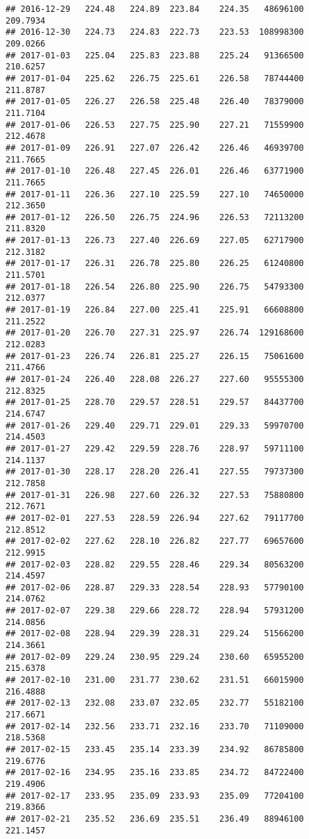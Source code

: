 \documentclass[
]{article}
\begin{document}
\begin{verbatim}
## 2016-12-29   224.48   224.89  223.84    224.35   48696100     209.7934
## 2016-12-30   224.73   224.83  222.73    223.53  108998300     209.0266
## 2017-01-03   225.04   225.83  223.88    225.24   91366500     210.6257
## 2017-01-04   225.62   226.75  225.61    226.58   78744400     211.8787
## 2017-01-05   226.27   226.58  225.48    226.40   78379000     211.7104
## 2017-01-06   226.53   227.75  225.90    227.21   71559900     212.4678
## 2017-01-09   226.91   227.07  226.42    226.46   46939700     211.7665
## 2017-01-10   226.48   227.45  226.01    226.46   63771900     211.7665
## 2017-01-11   226.36   227.10  225.59    227.10   74650000     212.3650
## 2017-01-12   226.50   226.75  224.96    226.53   72113200     211.8320
## 2017-01-13   226.73   227.40  226.69    227.05   62717900     212.3182
## 2017-01-17   226.31   226.78  225.80    226.25   61240800     211.5701
## 2017-01-18   226.54   226.80  225.90    226.75   54793300     212.0377
## 2017-01-19   226.84   227.00  225.41    225.91   66608800     211.2522
## 2017-01-20   226.70   227.31  225.97    226.74  129168600     212.0283
## 2017-01-23   226.74   226.81  225.27    226.15   75061600     211.4766
## 2017-01-24   226.40   228.08  226.27    227.60   95555300     212.8325
## 2017-01-25   228.70   229.57  228.51    229.57   84437700     214.6747
## 2017-01-26   229.40   229.71  229.01    229.33   59970700     214.4503
## 2017-01-27   229.42   229.59  228.76    228.97   59711100     214.1137
## 2017-01-30   228.17   228.20  226.41    227.55   79737300     212.7858
## 2017-01-31   226.98   227.60  226.32    227.53   75880800     212.7671
## 2017-02-01   227.53   228.59  226.94    227.62   79117700     212.8512
## 2017-02-02   227.62   228.10  226.82    227.77   69657600     212.9915
## 2017-02-03   228.82   229.55  228.46    229.34   80563200     214.4597
## 2017-02-06   228.87   229.33  228.54    228.93   57790100     214.0762
## 2017-02-07   229.38   229.66  228.72    228.94   57931200     214.0856
## 2017-02-08   228.94   229.39  228.31    229.24   51566200     214.3661
## 2017-02-09   229.24   230.95  229.24    230.60   65955200     215.6378
## 2017-02-10   231.00   231.77  230.62    231.51   66015900     216.4888
## 2017-02-13   232.08   233.07  232.05    232.77   55182100     217.6671
## 2017-02-14   232.56   233.71  232.16    233.70   71109000     218.5368
## 2017-02-15   233.45   235.14  233.39    234.92   86785800     219.6776
## 2017-02-16   234.95   235.16  233.85    234.72   84722400     219.4906
## 2017-02-17   233.95   235.09  233.93    235.09   77204100     219.8366
## 2017-02-21   235.52   236.69  235.51    236.49   88946100     221.1457

\end{verbatim}
\end{document}
